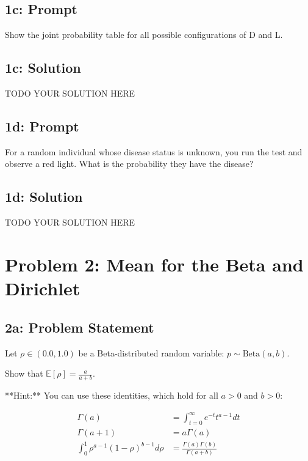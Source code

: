 \documentclass[12pt]{article}
\newcommand{\officialdirections}[1]{{\color{blue} #1}}
\begin{document}
\officialdirections{
\subsection*{1c: Prompt}

Show the joint probability table for all possible configurations of D and L.
}

\subsection{1c: Solution}
TODO YOUR SOLUTION HERE

\officialdirections{
\subsection*{1d: Prompt}

For a random individual whose disease status is unknown, you run the test and observe a red light. What is the probability they have the disease?
}

\subsection{1d: Solution}
TODO YOUR SOLUTION HERE



\newpage
\section*{Problem 2: Mean for the Beta and Dirichlet}

\officialdirections{
\subsection*{2a: Problem Statement}

Let $\rho \in (0.0, 1.0)$ be a Beta-distributed random variable: $p \sim \text{Beta}(a, b)$. 

Show that $\mathbb{E}[ \rho ] = \frac{a}{a + b}$.

**Hint:** You can use these identities, which hold for all $a > 0$ and $b > 0$:

\begin{align}
\Gamma(a) &= \int_{t=0}^{\infty} e^{-t} t^{a-1} dt
\\
\Gamma(a+1) &= a \Gamma(a)
\\
\int_{0}^1 \rho^{a-1} (1-\rho)^{b-1} d\rho &= \frac{\Gamma(a)\Gamma(b)}{\Gamma(a+b)}
\end{align}
}
\end{document}
